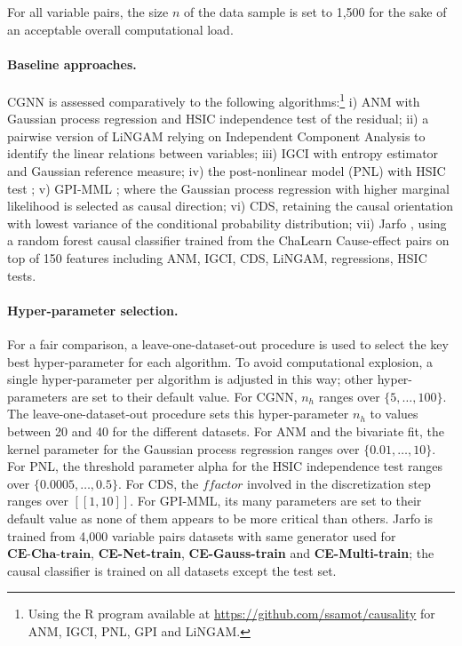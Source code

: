 \documentclass[a4paper, 11pt]{article}
\begin{document}
For all variable pairs, the size $n$ of the data sample is set to 1,500 for the sake of an acceptable overall computational load. 

\paragraph{Baseline approaches.}
CGNN is assessed comparatively to the following algorithms:\footnote{Using the  R program available at \url{https://github.com/ssamot/causality} for ANM, IGCI, PNL, GPI and LiNGAM.} i) ANM \citep{mooij2016distinguishing} with Gaussian process regression and HSIC independence test of the residual; ii) a pairwise version of LiNGAM \citep{shimizu2006linear} relying on Independent Component Analysis to identify the linear relations between variables; iii) IGCI \citep{daniusis2012inferring} with entropy estimator and Gaussian reference measure; iv) the post-nonlinear model (PNL) with HSIC test \citep{zhang2009identifiability}; v) GPI-MML \citep{stegle2010probabilistic}; where the Gaussian process regression with
higher marginal likelihood is selected as causal direction; vi) CDS, retaining the causal orientation with lowest variance of the conditional probability distribution; vii) Jarfo \citep{fonollosa2016conditional}, using a random forest causal classifier trained from the ChaLearn Cause-effect pairs on top of 150 features including ANM, IGCI, CDS, LiNGAM, regressions, HSIC tests.

\paragraph{Hyper-parameter selection.}
For a fair comparison, a leave-one-dataset-out procedure is used to select the key best hyper-parameter for each algorithm. To avoid computational explosion, a single hyper-parameter per algorithm is adjusted in this way; other hyper-parameters are set to their default value. 
For CGNN, $n_h$ ranges over $\{5,\ldots,100\}$. The leave-one-dataset-out procedure sets this hyper-parameter $n_h$ to values between 20 and 40 for the different datasets. 
For ANM and the bivariate fit, the kernel parameter for the Gaussian process regression ranges over $\{0.01, \ldots, 10\}$. For PNL, the threshold parameter alpha for the HSIC independence test ranges over $\{0.0005, \ldots,0.5\}$. For CDS, the $ffactor$ involved in the discretization step ranges over $[[1,10]]$. For GPI-MML, its many parameters are set to their default value as none of them appears to be more critical than others. 
Jarfo is trained from  4,000 variable pairs datasets with same generator used for  $\textbf{CE-Cha-train}$, \textbf{CE-Net-train}, \textbf{CE-Gauss-train} and \textbf{CE-Multi-train}; the causal classifier is trained on all datasets except the test set.
\end{document}
